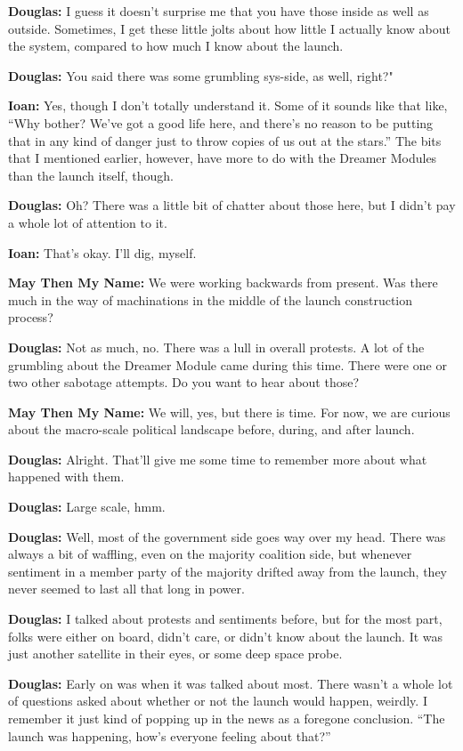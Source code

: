 \textbf{Douglas:} I guess it doesn't surprise me that you have those inside as well as outside. Sometimes, I get these little jolts about how little I actually know about the system, compared to how much I know about the launch.

\textbf{Douglas:} You said there was some grumbling sys-side, as well, right?"

\textbf{Ioan:} Yes, though I don't totally understand it. Some of it sounds like that like, ``Why bother? We've got a good life here, and there's no reason to be putting that in any kind of danger just to throw copies of us out at the stars.'' The bits that I mentioned earlier, however, have more to do with the Dreamer Modules than the launch itself, though.

\textbf{Douglas:} Oh? There was a little bit of chatter about those here, but I didn't pay a whole lot of attention to it.

\textbf{Ioan:} That's okay. I'll dig, myself.

\textbf{May Then My Name:} We were working backwards from present. Was there much in the way of machinations in the middle of the launch construction process?

\textbf{Douglas:} Not as much, no. There was a lull in overall protests. A lot of the grumbling about the Dreamer Module came during this time. There were one or two other sabotage attempts. Do you want to hear about those?

\textbf{May Then My Name:} We will, yes, but there is time. For now, we are curious about the macro-scale political landscape before, during, and after launch.

\textbf{Douglas:} Alright. That'll give me some time to remember more about what happened with them.

\textbf{Douglas:} Large scale, hmm.

\textbf{Douglas:} Well, most of the government side goes way over my head. There was always a bit of waffling, even on the majority coalition side, but whenever sentiment in a member party of the majority drifted away from the launch, they never seemed to last all that long in power.

\textbf{Douglas:} I talked about protests and sentiments before, but for the most part, folks were either on board, didn't care, or didn't know about the launch. It was just another satellite in their eyes, or some deep space probe.

\textbf{Douglas:} Early on was when it was talked about most. There wasn't a whole lot of questions asked about whether or not the launch would happen, weirdly. I remember it just kind of popping up in the news as a foregone conclusion. ``The launch was happening, how's everyone feeling about that?''

